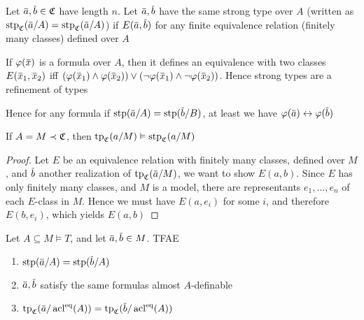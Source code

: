 \documentclass[11pt]{article}
\begin{document}
\begin{definition}[]
Let \(\bara,\barb\in\fC\) have length \(n\). Let \(\bara,\barb\) have the same strong type
over \(A\) (written as \(\stp_{\fC}(\bara/A)=\stp_{\fC}(\bara/A)\)) if \(E(\bara,\barb)\) for any
finite equivalence relation (finitely many classes) defined over \(A\)
\end{definition}

\begin{remark}
If \(\varphi(\barx)\) is a formula over \(A\), then it defines an equivalence with two
classes \(E(\barx_1,\barx_2)\) iff \((\varphi(\barx_1)\wedge\varphi(\barx_2))\vee(\neg\varphi(\barx_1)\wedge\neg\varphi(\barx_2))\). Hence strong
types are a refinement of types

Hence for any formula if \(\stp(\bara/A)=\stp(\barb/B)\), at least we have \(\varphi(\bara)\leftrightarrow\varphi(\barb)\)
\end{remark}

\begin{lemma}[]
If \(A=M\prec\mathfrak{C}\), then \(\operatorname{tp}_{\mathfrak{C}}(a/M)\vDash\operatorname{stp}_{\mathfrak{C}}(a/M)\)
\end{lemma}


\begin{proof}
Let \(E\) be an equivalence relation with finitely many classes, defined over \(M\),
and \(\barb\) another realization of \(\tp_{\fC}(\bara/M)\), we want to show \(E(a,b)\).
Since \(E\) has only finitely many classes, and \(M\) is a model, there are
representants \(e_1,\dots,e_n\) of each \(E\)-class in \(M\). Hence we must have \(E(a,e_i)\) for
some \(i\), and therefore \(E(b,e_i)\), which yields \(E(a,b)\)
\end{proof}

\begin{lemma}[]
Let \(A\subseteq M\vDash T\), and let \(\bara,\barb\in M\). TFAE
\begin{enumerate}
\item \(\stp(\bara/A)=\stp(\barb/A)\)
\item \(\bara,\barb\) satisfy the same formulas almost \(A\)-definable
\item \(\tp_{\fC}(\bara/\acl^{\eq}(A))=\tp_{\fC}(\barb/\acl^{\eq}(A))\)
\end{enumerate}
\end{lemma}
\end{document}
